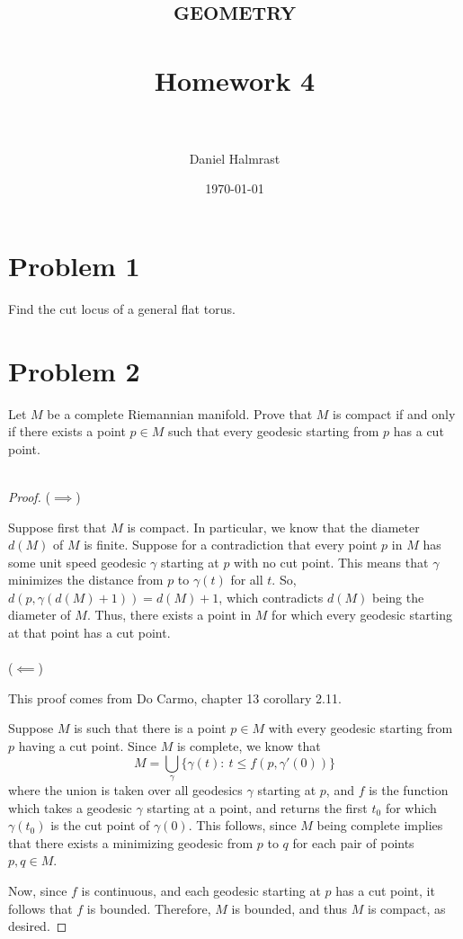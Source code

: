 \documentclass[fontsize=11pt]{scrartcl} %
\title{	
\normalfont \normalsize 
\textsc{geometry} \\ [25pt] %
\horrule{0.5pt} \\[0.4cm] %
\huge Homework 4 \\ %
\horrule{2pt} \\[0.5cm] %
}
\author{Daniel Halmrast} %
\date{\normalsize\today} %
\numberwithin{equation}{section} %
\numberwithin{figure}{section} %
\numberwithin{table}{section} %
\begin{document}
\maketitle %

\section*{Problem 1}
Find the cut locus of a general flat torus.

\newpage

\section*{Problem 2}
Let $M$ be a complete Riemannian manifold. Prove that $M$ is compact if and only
if there exists a point $p\in M$ such that every geodesic starting from $p$ has
a cut point.
\\
\\
\begin{proof}
    ($\implies$)
    
    Suppose first that $M$ is compact. In particular, we know that the diameter
    $d(M)$ of $M$ is finite. Suppose for a contradiction that every point $p$ in
    $M$ has some unit speed geodesic $\gamma$ starting at $p$ with no cut
    point. This means that $\gamma$ minimizes the distance from $p$ to
    $\gamma(t)$ for all $t$. So, $d(p,\gamma(d(M)+1)) = d(M)+1$, which
    contradicts $d(M)$ being the diameter of $M$. Thus, there exists a point in
    $M$ for which every geodesic starting at that point has a cut point.
    \\
    \\
    ($\impliedby$)

    This proof comes from Do Carmo, chapter 13 corollary 2.11.

    Suppose $M$ is such that there is a point $p\in M$ with every geodesic
    starting from $p$ having a cut point. Since $M$ is complete, we know that
    \[
        M = \bigcup_{\gamma}\{\gamma(t):\ t\leq f(p,\gamma'(0))\}
    \]
    where the union is taken over all geodesics $\gamma$ starting at $p$, and
    $f$ is the function which takes a geodesic $\gamma$ starting at a point, and
    returns the first $t_0$ for which $\gamma(t_0)$ is the cut point of
    $\gamma(0)$. This follows, since $M$ being complete implies that there
    exists a minimizing geodesic from $p$ to $q$ for each pair of points $p,q\in
    M$.

    Now, since $f$ is continuous, and each geodesic starting at $p$ has a cut
    point, it follows that $f$ is bounded. Therefore, $M$ is bounded, and thus
    $M$ is compact, as desired.
\end{proof}
\end{document}
